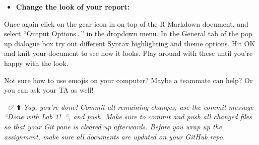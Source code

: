 \documentclass[
]{article}
\newenvironment{Shaded}{\begin{snugshade}}{\end{snugshade}}
\newcommand{\NormalTok}[1]{#1}
\providecommand{\tightlist}{%
  \setlength{\itemsep}{0pt}\setlength{\parskip}{0pt}}
\begin{document}
\begin{itemize}
\tightlist
\item
  \textbf{Change the look of your report:}
\end{itemize}

Once again click on the gear icon in on top of the R Markdown document,
and select ``Output Options\ldots{}'' in the dropdown menu. In the
General tab of the pop up dialogue box try out different Syntax
highlighting and theme options. Hit OK and knit your document to see how
it looks. Play around with these until you're happy with the look.

\begin{Shaded}
\begin{Highlighting}[]
\NormalTok{Not sure how to use emojis on your computer? Maybe a teammate can help? Or you can ask your TA as well!}
\end{Highlighting}
\end{Shaded}

🧶 ✅ ⬆️ \emph{Yay, you're done! Commit all remaining changes, use the
commit message ``Done with Lab 1!} 💪\emph{``, and push. Make sure to
commit and push all changed files so that your Git pane is cleared up
afterwards. Before you wrap up the assignment, make sure all documents
are updated on your GitHub repo.}
\end{document}
